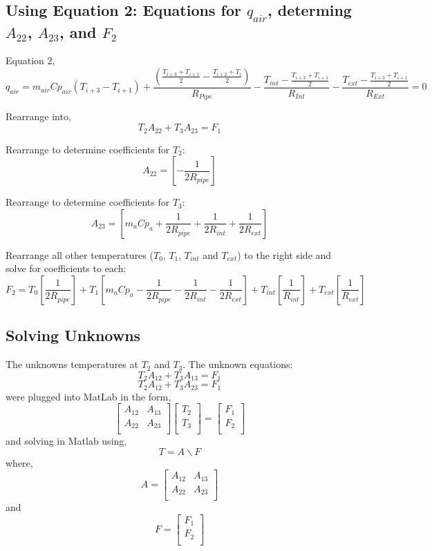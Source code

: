 \documentclass[12pt]{report}
\begin{document}
\subsection{Using Equation 2: Equations for $q_{air}$, determing $A_{22}$, $A_{23}$, and $F_2$}

Equation 2, 
$$ q_{air} = m_{air} Cp_{air} (T_{i+3}-T_{i+1}) 
+ \frac{
	\left( 
	\frac{T_{i+3}+T_{i+1}}{2} 
	- \frac{T_{i+2}+T_{i}}{2} 
	\right)}
{R_{Pipe}} 
- \frac{T_{int} - \frac{T_{i+3}+T_{i+1}}{2}}{R_{Int}}
- \frac{T_{ext} - \frac{T_{i+3}+T_{i+1}}{2}}{R_{Ext}} = 0 $$

Rearrange into,
$$ T_2 A_{22} + T_3 A_{23} = F_1 $$

Rearrange to determine coefficients for $T_2$:
$$ A_{22} = [- \frac{1}{2 R_{pipe}}] $$

Rearrange to determine coefficients for $T_3$:
$$ A_{23} = [ m_a Cp_a + \frac{1}{2 R_{pipe}} + \frac{1}{2 R_{int}} + \frac{1}{2 R_{ext}}] $$

Rearrange all other temperatures ($T_0$, $T_1$, $T_{int}$ and $T_{ext}$) to the right side and solve for coefficients to each:
$$ F_2 = 
	T_0 [\frac{1}{2 R_{pipe}}] 
	+ T_1 [m_a Cp_a - \frac{1}{2 R_{pipe}} - \frac{1}{2 R_{int}} - \frac{1}{2 R_{ext}}] 
	+ T_{int} [\frac{1}{R_{int}}]
	+ T_{ext} [\frac{1}{R_{ext}}]$$


\subsection{Solving Unknowns}
The unknowns temperatures at $T_2$ and $T_3$. The unknown equations: 
$$ T_2 A_{12} + T_3 A_{13} = F_1 $$
$$ T_2 A_{12} + T_3 A_{23} = F_1 $$
were plugged into MatLab in the form, 
$$
\left[ \begin{matrix}
A_{12} & A_{13} \\
A_{22} & A_{23} \\
\end{matrix}\right] 
\left[ \begin{matrix}
T_{2} \\
T_{3} \\
\end{matrix}
\right] 
= \left[ \begin{matrix}
F_1 \\
F_2 \\
\end{matrix}
\right]
$$
and solving in Matlab using,
$$ T = A \backslash F $$
where, 
$$ A = \left[ \begin{matrix}
A_{12} & A_{13} \\
A_{22} & A_{23} \\
\end{matrix}\right] $$
and
$$ F = \left[ \begin{matrix}
F_1 \\
F_2 \\
\end{matrix}
\right] $$
\end{document}
